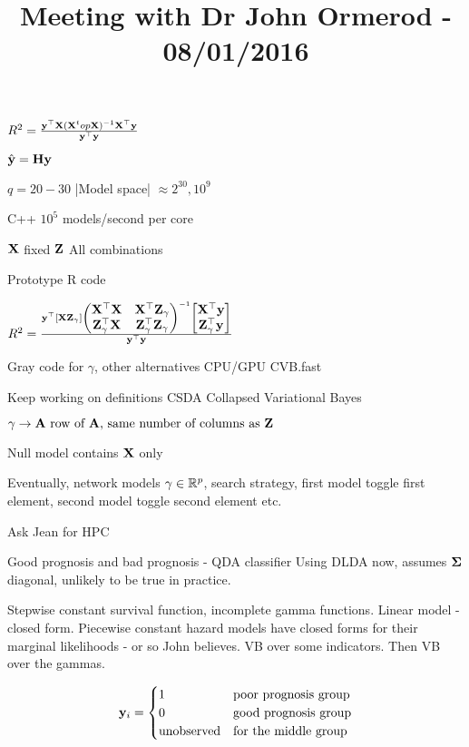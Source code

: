 \documentclass{amsart}
\title{Meeting with Dr John Ormerod - 08/01/2016}
\begin{document}
\maketitle

$R^2 = \frac{{\bf y}^\top {\bf X} ({\bf X}^top {\bf X})^{-1} {\bf X}^\top {\bf y}}{{\bf y}^\top {\bf y}}$

$\hat{{\bf y}} = {\bf H} {\bf y}$

$q = 20 - 30$
|Model space| $\approx 2^30, 10^9$

C++ $10^5$ models/second per core

${\bf X}$ fixed
${\bf Z}$ All combinations

Prototype R code

$R^2 = \frac{{\bf y}^\top [{\bf X} {\bf Z}_\gamma]
\begin{pmatrix}
{\bf X}^\top {\bf X} & {\bf X}^\top {\bf Z}_\gamma \\
{\bf Z}_\gamma ^\top {\bf X} & {\bf Z}_\gamma^\top {\bf Z}_\gamma
\end{pmatrix}^{-1}
\begin{bmatrix}
{\bf X}^\top {\bf y} \\
{\bf Z}_\gamma^\top {\bf y}
\end{bmatrix}}{{\bf y}^\top {\bf y}}
$

Gray code for $\gamma$, other alternatives
CPU/GPU
CVB.fast

Keep working on definitions
CSDA
Collapsed Variational Bayes

$\gamma \to {\bf A} \text{ row of ${\bf A}$, same number of columns as ${\bf Z}$}$

Null model contains ${\bf X}$ only

Eventually, network models
$\gamma \in {\mathbb R}^p$, search strategy, first model toggle first element, second model toggle second element etc.

Ask Jean for HPC

Good prognosis and bad prognosis - QDA classifier
Using DLDA now, assumes ${\boldsymbol \Sigma}$ diagonal, unlikely to be true in practice.


Stepwise constant survival function, incomplete gamma functions.
Linear model - closed form.
Piecewise constant hazard models have closed forms for their marginal likelihoods - or so John believes.
VB over some indicators.
Then VB over the gammas.

$$
{\bf y}_i =
\begin{cases}
1 & \text{poor prognosis group} \\
0 & \text{good prognosis group} \\
\text{unobserved} & \text{for the middle group}
\end{cases}
$$
\end{document}
